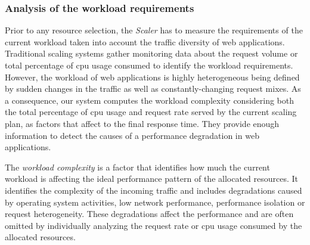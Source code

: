 


\subsubsection{Analysis of the workload requirements\label{workloadReq}}

Prior to any resource selection, the \emph{Scaler} has to measure the requirements of the current workload taken into account the traffic diversity of web applications. Traditional scaling systems gather monitoring data about the request volume or total percentage of cpu usage consumed to identify the workload requirements. However, the workload of web applications is highly heterogeneous being defined by sudden changes in the traffic as well as constantly-changing request mixes. As a consequence, our system computes the workload complexity considering both the total percentage of cpu usage and request rate served by the current scaling plan,  as factors that affect to the final response time. They provide enough information to detect the causes of a performance degradation in web applications. 


The \emph{workload complexity} is a factor that identifies how much the current workload is affecting the ideal performance pattern of the allocated resources. It identifies the complexity of the incoming traffic and includes degradations caused by operating system activities, low network performance, performance isolation or request heterogeneity. These degradations affect the performance and are often omitted by individually analyzing the request rate or cpu usage consumed by the allocated resources. 

